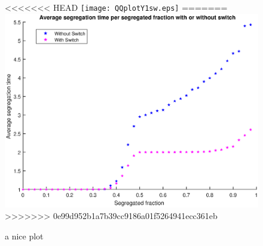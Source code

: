 \documentclass{article}
\begin{document}
\begin{figure}[h]
\centering

<<<<<<< HEAD
\texttt{[image: QQplotY1sw.eps]}
=======
\includegraphics{Avesegsw2.eps}
>>>>>>> 0e99d952b1a7b39cc9186a01f5264941ecc361eb
\caption{a nice plot}
\label{fig:mesh1}
\end{figure}
\end{document}
